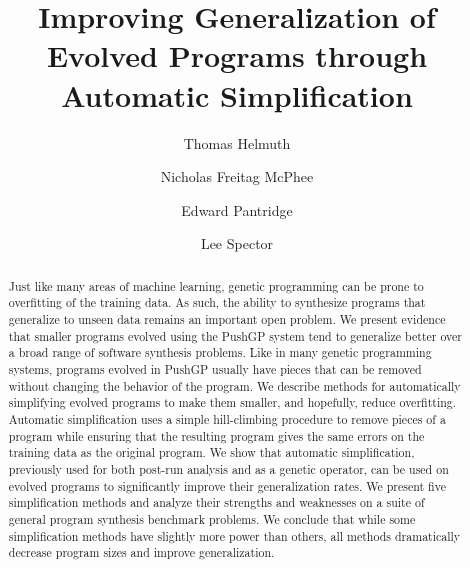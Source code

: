 \documentclass[sigconf]{acmart}
\begin{document}
\title{Improving Generalization of Evolved Programs through Automatic Simplification}

\author{Thomas Helmuth}

\author{Nicholas Freitag McPhee}

\author{Edward Pantridge}

\author{Lee Spector}



\begin{abstract}
Just like many areas of machine learning, genetic programming can be prone to overfitting of the training data. As such, the ability to synthesize programs that generalize to unseen data remains an important open problem. We present evidence that smaller programs evolved using the PushGP system tend to generalize better over a broad range of software synthesis problems. Like in many genetic programming systems, programs evolved in PushGP usually have pieces that can be removed without changing the behavior of the program. We describe methods for automatically simplifying evolved programs to make them smaller, and hopefully, reduce overfitting. Automatic simplification uses a simple hill-climbing procedure to remove pieces of a program while ensuring that the resulting program gives the same errors on the training data as the original program. We show that automatic simplification, previously used for both post-run analysis and as a genetic operator, can be used on evolved programs to significantly improve their generalization rates. We present five simplification methods and analyze their strengths and weaknesses on a suite of general program synthesis benchmark problems. We conclude that while some simplification methods have slightly more power than others, all methods dramatically decrease program sizes and improve generalization.
\end{abstract}
\end{document}
